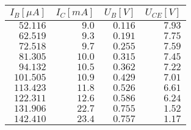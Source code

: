 \begin{tabular}{r r r r}
\(I_B [\mu A]\) & \(I_C [mA]\) & \(U_B [V]\) & \(U_{CE}[V]\) \\
\hline
\(52.116\) & \(9.0\) & \(0.116\) & \(7.93\) \\ 
\(62.519\) & \(9.3\) & \(0.191\) & \(7.75\) \\ 
\(72.518\) & \(9.7\) & \(0.255\) & \(7.59\) \\ 
\(81.305\) & \(10.0\) & \(0.315\) & \(7.45\) \\ 
\(94.132\) & \(10.5\) & \(0.362\) & \(7.22\) \\ 
\(101.505\) & \(10.9\) & \(0.429\) & \(7.01\) \\ 
\(113.423\) & \(11.8\) & \(0.526\) & \(6.61\) \\ 
\(122.311\) & \(12.6\) & \(0.586\) & \(6.24\) \\ 
\(131.906\) & \(22.7\) & \(0.755\) & \(1.52\) \\ 
\(142.410\) & \(23.4\) & \(0.757\) & \(1.17\)
\end{tabular}
